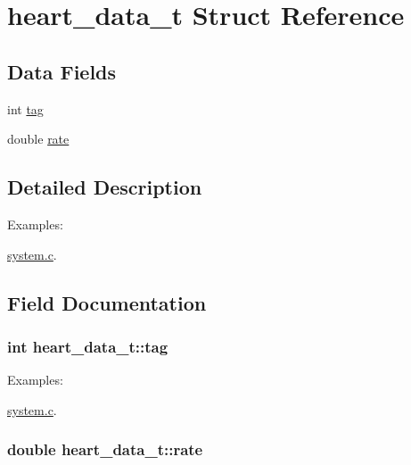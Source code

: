 \hypertarget{structheart__data__t}{
\section{heart\_\-data\_\-t Struct Reference}
\label{structheart__data__t}
}
\subsection*{Data Fields}
\begin{CompactItemize}
\item 
int \hyperlink{structheart__data__t_9a422c85b591dbed20cdc208ac2e8992}{tag}
\item 
double \hyperlink{structheart__data__t_63b04f52d0c4806ffc2cefd48a2a7b26}{rate}
\end{CompactItemize}


\subsection{Detailed Description}
\begin{Desc}
\item[Examples: ]\par


\hyperlink{system_8c-example}{system.c}.\end{Desc}


\subsection{Field Documentation}
\hypertarget{structheart__data__t_9a422c85b591dbed20cdc208ac2e8992}{
\subsubsection[tag]{\setlength{\rightskip}{0pt plus 5cm}int {\bf heart\_\-data\_\-t::tag}}}
\label{structheart__data__t_9a422c85b591dbed20cdc208ac2e8992}


\begin{Desc}
\item[Examples: ]\par
\hyperlink{system_8c-example}{system.c}.\end{Desc}
\hypertarget{structheart__data__t_63b04f52d0c4806ffc2cefd48a2a7b26}{
\subsubsection[rate]{\setlength{\rightskip}{0pt plus 5cm}double {\bf heart\_\-data\_\-t::rate}}}
\label{structheart__data__t_63b04f52d0c4806ffc2cefd48a2a7b26}


